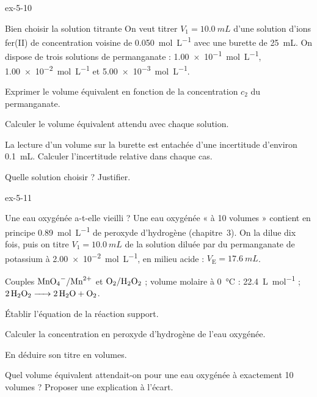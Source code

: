 \begin{blocLivre}{ex-5-10}
\begin{exercice}[2]{Bien choisir la solution titrante}
On veut titrer $V_1=\qty{10,0}{mL}$ d'une solution d'ions fer(II) de concentration voisine de \qty{0,050}{mol.L^{-1}} avec une burette de
\qty{25}{mL}. On dispose de trois solutions de permanganate : \qty{1,00e-1}{mol.L^{-1}}, \qty{1,00e-2}{mol.L^{-1}} et \qty{5,00e-3}{mol.L^{-1}}.
\begin{questions}
\item Exprimer le volume équivalent en fonction de la concentration $c_2$ du permanganate.
\item Calculer le volume équivalent attendu avec chaque solution.
\item La lecture d'un volume sur la burette est entachée d'une incertitude d'environ \qty{0,1}{mL}. Calculer l'incertitude relative
dans chaque cas.
\item Quelle solution choisir ? Justifier.
\end{questions}
\end{exercice}
\end{blocLivre}
\begin{blocLivre}{ex-5-11}
\begin{exercice}[2]{Une eau oxygénée a-t-elle vieilli ?}
Une eau oxygénée « à 10 volumes » contient en principe \qty{0,89}{mol.L^{-1}} de peroxyde d'hydrogène (chapitre~3). On la dilue dix fois,
puis on titre $V_1=\qty{10,0}{mL}$ de la solution diluée par du permanganate de potassium à \qty{2,00e-2}{mol.L^{-1}}, en milieu acide :
$V_\mathrm{E}=\qty{17,6}{mL}$.
\begin{donnees}
Couples $\ce{MnO4-}/\ce{Mn^{2+}}$ et $\ce{O2}/\ce{H2O2}$ ; volume molaire à \qty{0}{\degreeCelsius} : \qty{22,4}{L.mol^{-1}} ; $\ce{2H2O2 -> 2H2O + O2}$.
\end{donnees}
\begin{questions}
\item Établir l'équation de la réaction support.
\item Calculer la concentration en peroxyde d'hydrogène de l'eau oxygénée.
\item En déduire son titre en volumes.
\item Quel volume équivalent attendait-on pour une eau oxygénée à exactement 10 volumes ? Proposer une explication à l'écart.
\end{questions}
\end{exercice}
\end{blocLivre}
